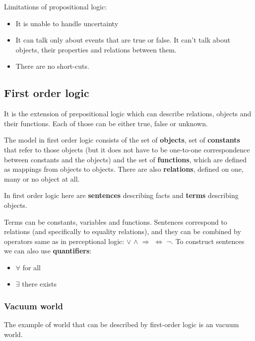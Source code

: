 \documentclass[a4paper,10pt]{article}
\begin{document}
Limitations of propositional logic:\begin{itemize}
\setlength{\itemsep}{0pt}
\setlength{\parskip}{0pt}
\setlength{\parsep}{0pt}
\item It is unable to handle uncertainty
\item It can talk only about events that are true or false. It can't talk about objects, their properties and relations between them.
\item There are no short-cuts. 
\end{itemize}

\subsection{First order logic}

It is the extension of prepositional logic which can describe relations, objects and their functions.  Each of those can be either true, false or unknown.

The model in first order logic consists of the set of \textbf{objects}, set of \textbf{constants} that refer to those objects (but it does not have to be one-to-one correspondence between constants and the objects) and the set of \textbf{functions}, which are defined as mappings from objects to objects. There are also \textbf{relations}, defined on one, many or no object at all.

In first order logic here are \textbf{sentences} describing facts and \textbf{terms} describing objects. 

Terms can be constants, variables and functions. Sentences correspond to relations (and specifically to equality relations), and they can be combined by operators same as in perceptional logic: $\lor$ $\land$ $\Rightarrow$ $\iff$ $\lnot$. To construct sentences we can also use \textbf{quantifiers}:
\begin{itemize}
\setlength{\itemsep}{0pt}
\setlength{\parskip}{0pt}
\setlength{\parsep}{0pt}
\item $\forall$ for all
\item $\exists$ there exists
\end{itemize}

\subsubsection*{Vacuum world}

The example of world that can be described by first-order logic is an vacuum world.
\end{document}
